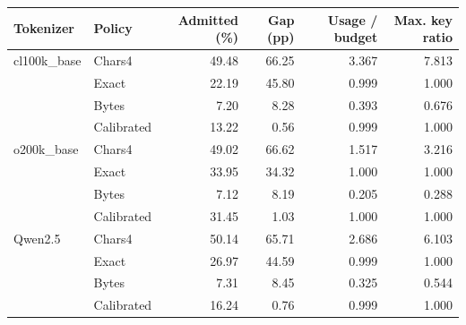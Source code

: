 \begin{tabular}{llrrrr}\toprule
Tokenizer & Policy & Admitted (\%) & Gap (pp) & Usage / budget & Max. key ratio\\\midrule
cl100k\_base & Chars4 & 49.48 & 66.25 & 3.367 & 7.813\\
 & Exact & 22.19 & 45.80 & 0.999 & 1.000\\
 & Bytes & 7.20 & 8.28 & 0.393 & 0.676\\
 & Calibrated & 13.22 & 0.56 & 0.999 & 1.000\\
\midrule
o200k\_base & Chars4 & 49.02 & 66.62 & 1.517 & 3.216\\
 & Exact & 33.95 & 34.32 & 1.000 & 1.000\\
 & Bytes & 7.12 & 8.19 & 0.205 & 0.288\\
 & Calibrated & 31.45 & 1.03 & 1.000 & 1.000\\
\midrule
Qwen2.5 & Chars4 & 50.14 & 65.71 & 2.686 & 6.103\\
 & Exact & 26.97 & 44.59 & 0.999 & 1.000\\
 & Bytes & 7.31 & 8.45 & 0.325 & 0.544\\
 & Calibrated & 16.24 & 0.76 & 0.999 & 1.000\\
\bottomrule\end{tabular}
